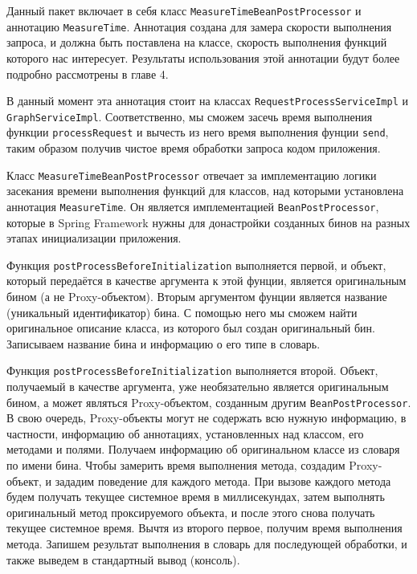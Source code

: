 Данный пакет включает в себя класс \texttt{MeasureTimeBeanPostProcessor} и аннотацию \texttt{MeasureTime}.
Аннотация создана для замера скорости выполнения запроса, и должна быть поставлена на классе, скорость выполнения функций которого нас интересует.
Результаты использования этой аннотации будут более подробно рассмотрены в главе 4. %

В данный момент эта аннотация стоит на классах \texttt{RequestProcessServiceImpl} и \texttt{GraphServiceImpl}. %
Соответственно, мы сможем засечь время выполнения функции \texttt{processRequest} и вычесть из него время выполнения фунции \texttt{send}, таким образом получив чистое время обработки запроса кодом приложения.

Класс \texttt{MeasureTimeBeanPostProcessor} отвечает за имплементацию логики засекания времени выполнения функций для классов, над которыми установлена аннотация \texttt{MeasureTime}.
Он является имплементацией \texttt{BeanPostProcessor}, которые в Spring Framework нужны для донастройки созданных бинов на разных этапах инициализации приложения.

Функция \texttt{postProcessBeforeInitialization} выполняется первой, и объект, который передаётся в качестве аргумента к этой фунции, является оригинальным бином (а не Proxy-объектом).
Вторым аргументом фунции является название (уникальный идентификатор) бина.
С помощью него мы сможем найти оригинальное описание класса, из которого был создан оригинальный бин.
Записываем название бина и информацию о его типе в словарь.

Функция \texttt{postProcessBeforeInitialization} выполняется второй.
Объект, получаемый в качестве аргумента, уже необязательно является оригинальным бином, а может являться Proxy-объектом, созданным другим \texttt{BeanPostProcessor}.
В свою очередь, Proxy-объекты могут не содержать всю нужную информацию, в частности, информацию об аннотациях, установленных над классом, его методами и полями.
Получаем информацию об оригинальном классе из словаря по имени бина.
Чтобы замерить время выполнения метода, создадим Proxy-объект, и зададим поведение для каждого метода.
При вызове каждого метода будем получать текущее системное время в миллисекундах, затем выполнять оригинальный метод проксируемого объекта, и после этого снова получать текущее системное время.
Вычтя из второго первое, получим время выполнения метода.
Запишем результат выполнения в словарь для последующей обработки, и также выведем в стандартный вывод (консоль).

